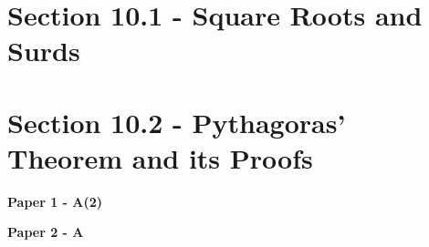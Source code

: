 \documentclass[12pt, a4paper]{article}
\begin{document}
\section*{Section 10.1 - Square Roots and Surds}\label{section:2-10-1}





\section*{Section 10.2 - Pythagoras' Theorem and its Proofs}\label{section:2-10-2}

\textbf{Paper 1 - A(2)}
\begin{enumx}[label=\arabic*.,start=1]
\item {}\label{DSE2018-CoreP1-Q13} 
\end{enumx}
\textbf{Paper 2 - A}
\begin{enumx}[label=\arabic*.,start=2]
\item {}\label{DSE2012S-CoreP2-Q20} 
\item {}\label{DSE2012P-CoreP2-Q18} 
\item {}\label{DSE2012-CoreP2-Q15} 
\item {}\label{DSE2012-CoreP2-Q23} 
\item {}\label{DSE2014-CoreP2-Q15} 
\item {}\label{DSE2014-CoreP2-Q23} 
\item {}\label{DSE2015-CoreP2-Q15} 
\item {}\label{DSE2015-CoreP2-Q23} 
\item {}\label{DSE2017-CoreP2-Q14} 
\item {}\label{DSE2017-CoreP2-Q19} 
\item {}\label{DSE2018-CoreP2-Q15} 
\item {}\label{DSE2018-CoreP2-Q24} 
\item {}\label{DSE2019-CoreP2-Q19} 
\end{enumx}
\end{document}

